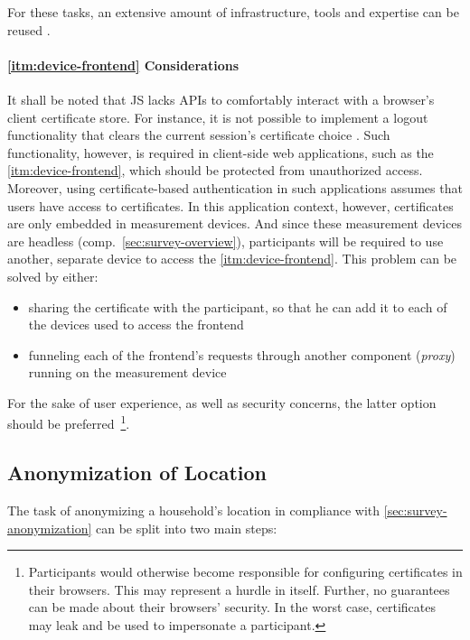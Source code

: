 For these tasks, an extensive amount of infrastructure, tools and expertise can be reused \cite[p.~37]{hummen2013towards}.


\paragraph{\ref*{itm:device-frontend} Considerations}
It shall be noted that \acl*{JS} lacks \acsp{API} to comfortably interact with a browser's client certificate store. For instance, it is not possible to implement a logout functionality that clears the current session's certificate choice \cite[p.~8]{parsovs2013practical}. Such functionality, however, is required in client-side web applications, such as the \ref{itm:device-frontend}, which should be protected from unauthorized access. Moreover, using certificate-based authentication in such applications assumes that users have access to certificates. In this application context, however, certificates are only embedded in measurement devices. And since these measurement devices are headless (comp.~\autoref{sec:survey-overview}), participants will be required to use another, separate device to access the \ref{itm:device-frontend}. This problem can be solved by either:

\newpage

\begin{itemize}
  \item sharing the certificate with the participant, so that he can add it to each of the devices used to access the frontend
  \item funneling each of the frontend's requests through another component (\textit{proxy}) running on the measurement device
\end{itemize}

For the sake of user experience, as well as security concerns, the latter option should be preferred~\footnote{Participants would otherwise become responsible for configuring certificates in their browsers. This may represent a hurdle in itself. Further, no guarantees can be made about their browsers' security. In the worst case, certificates may leak and be used to impersonate a participant.}.


\subsection{Anonymization of Location}
\label{sec:anonymization-of-location-realization}

The task of anonymizing a household's location in compliance with \autoref{sec:survey-anonymization} can be split into two main steps:

